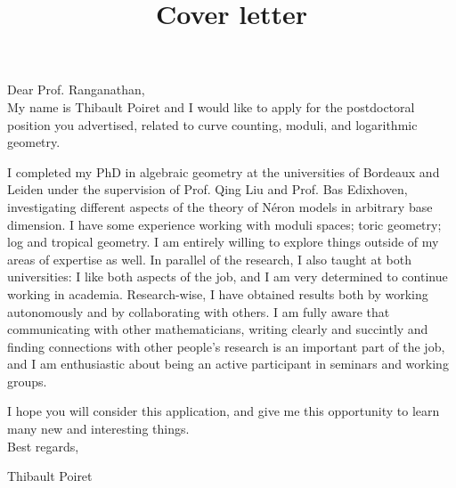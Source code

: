 \documentclass[12pt]{extarticle}
\title{Cover letter}
\date{}
\begin{document}
\maketitle

Dear Prof. Ranganathan,\\

My name is Thibault Poiret and I would like to apply for the postdoctoral position you advertised, related to curve counting, moduli, and logarithmic geometry.

I completed my PhD in algebraic geometry at the universities of Bordeaux and Leiden under the supervision of Prof. Qing Liu and Prof. Bas Edixhoven, investigating different aspects of the theory of Néron models in arbitrary base dimension. I have some experience working with moduli spaces; toric geometry; log and tropical geometry. I am entirely willing to explore things outside of my areas of expertise as well. In parallel of the research, I also taught at both universities: I like both aspects of the job, and I am very determined to continue working in academia. Research-wise, I have obtained results both by working autonomously and by collaborating with others. I am fully aware that communicating with other mathematicians, writing clearly and succintly and finding connections with other people's research is an important part of the job, and I am enthusiastic about being an active participant in seminars and working groups.

I hope you will consider this application, and give me this opportunity to learn many new and interesting things.\\

Best regards,

Thibault Poiret
\end{document}
